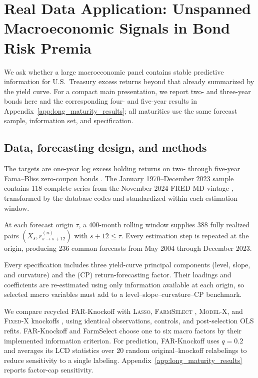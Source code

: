 \section{Real Data Application: Unspanned Macroeconomic Signals in Bond Risk Premia}
\label{sec:app}

We ask whether a large macroeconomic panel contains stable predictive
information for U.S.\ Treasury excess returns beyond that already summarized by
the yield curve. For a compact main presentation, we report two- and three-year
bonds here and the corresponding four- and five-year results in
Appendix~\ref{app:long_maturity_results}; all maturities use the same forecast
sample, information set, and specification.

\subsection{Data, forecasting design, and methods}
\label{sec:app_design_v7}

The targets are one-year log excess holding returns on two- through five-year
Fama--Bliss zero-coupon bonds \citep{LudvigsonNg2009}. The January 1970--December
2023 sample contains 118 complete series from the November 2024 FRED-MD vintage
\citep{McCrackenNg2016}, transformed by the database codes and standardized
within each estimation window.

At each forecast origin $\tau$, a 400-month rolling window supplies 388 fully
realized pairs $(X_s,r^{(n)}_{s\to s+12})$ with $s+12\leq\tau$. Every estimation
step is repeated at the origin, producing 236 common forecasts from May 2004
through December 2023.

Every specification includes three yield-curve principal components (level,
slope, and curvature) \citep{LittermanScheinkman1991} and the
\citet{CochranePiazzesi2005} (CP) return-forecasting factor. Their loadings and
coefficients are re-estimated using only information available at each origin,
so selected macro variables must add to a level--slope--curvature--CP benchmark.

We compare recycled FAR-Knockoff with \textsc{Lasso}, \textsc{FarmSelect}
\citep{FanKeWang2020}, \textsc{Model-X}, and \textsc{Fixed-X} knockoffs
\citep{BarberCandes2015,CandesFanEtal2018}, using identical observations,
controls, and post-selection OLS refits. FAR-Knockoff and FarmSelect choose one
to six macro factors by their implemented information criterion. For prediction,
FAR-Knockoff uses $q=0.2$ and averages its LCD statistics over 20 random
original--knockoff relabelings to reduce sensitivity to a single labeling.
Appendix~\ref{app:long_maturity_results} reports factor-cap sensitivity.

